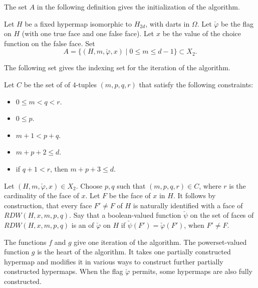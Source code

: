 The set $A$ in the following definition gives the initialization of the algorithm.

\begin{definition}[A]
Let $H$ be a fixed hypermap isomorphic to $H_{2d}$, with darts in $\Omega$.
Let $\check\varphi$ be the flag on $H$ (with one true face and one
false face).  Let $x$ be the value of the choice function on the false
face.  Set
\begin{displaymath}
A = \{(H,m,\check\varphi,x) \mid 0\le m \le d-1\} \subset X_2.
\end{displaymath}
\end{definition}

The following set gives the indexing set for the iteration of the algorithm.

\begin{definition}[C]
Let $C$ be the set of of $4$-tuples $(m,p,q,r)$ that satisfy the following
constraints:
\begin{itemize}
\item $0\le m < q < r$.
\item $0\le p$.
\item $m+1 < p+q$.
\item $m+p+2 \le d$.
\item if $q+1< r$, then $m+p+3\le d$.
\end{itemize}
\end{definition}

\begin{definition}[extension]  
  Let $(H,m,\check\varphi,x)\in X_2$.  Choose $p,q$ such that $(m,p,q,r)\in
  C$, where $r$ is the cardinality of the face of $x$.  Let $F$ be the
  face of $x$ in $H$.  It follows by construction, that every face
  $F'\ne F$ of $H$ is naturally identified with a face of
  $RDW(H,x,m,p,q)$.  Say that a boolean-valued function $\check\psi$ on the
  set of faces of $RDW(H,x,m,p,q)$ is an  of
  $\check\varphi$ on $H$ if $\check\psi(F') =\check\varphi(F')$, when $F'\ne F$.
\end{definition}


The functions $f$ and $g$ give one iteration of the algorithm.  The
powerset-valued function $g$ is the heart of the algorithm.  It takes
one partially constructed hypermap and modifies it in various ways to
construct further partially constructed hypermaps.  When the flag
$\check\varphi$ permits, some hypermaps are also fully constructed.


